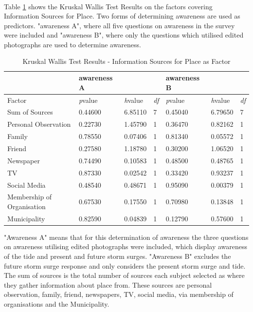 \paragraph{}

Table \ref{kw_test_info_place} shows the Kruskal Wallis Test Results on the factors covering Information Sources for Place. Two forms of determining awareness are used as predictors. "awareness A", where all five questions on awareness in the survey were included and "awareness B", where only the questions which utilised edited photographs are used to determine awareness.

\begin{table}[H]
    \centering
    \begin{tabular}{|l|l|l|l|l|l|l|}
    \hline
       & \textbf{awareness A} & ~ & ~ & \textbf{awareness B} & ~ & ~ \\ \hline
       Factor &\textit{p}value &\textit{h}value & \textit{df} &\textit{p}value &\textit{h}value & \textit{df} \\ \hline
        Sum of Sources  & 0.44600 & 6.85110 & 7 & 0.45040 & 6.79650 & 7 \\ \hline
        Personal Observation & 0.22730 & 1.45790 & 1 & 0.36470 & 0.82162 & 1 \\ \hline
        Family & 0.78550 & 0.07406 & 1 & 0.81340 & 0.05572 & 1 \\ \hline
        Friend & 0.27580 & 1.18780 & 1 & 0.30200 & 1.06520 & 1 \\ \hline
        Newspaper & 0.74490 & 0.10583 & 1 & 0.48500 & 0.48765 & 1 \\ \hline
        TV & 0.87330 & 0.02542 & 1 & 0.33420 & 0.93237 & 1 \\ \hline
        Social Media & 0.48540 & 0.48671 & 1 & 0.95090 & 0.00379 & 1 \\ \hline
        Membership of Organisation  & 0.67530 & 0.17550 & 1 & 0.70980 & 0.13848 & 1 \\ \hline
        Municipality & 0.82590 & 0.04839 & 1 & 0.12790 & 0.57600 & 1 \\ \hline
        \hline
    \end{tabular}
    \caption{Kruskal Wallis Test Results - Information Sources for Place as Factor}{  "Awareness A" means that for this determination of awareness the three questions on awareness utilising edited photographs were included, which display awareness of the tide and present and future storm surges.  "Awareness B" excludes the future storm surge response and only considers the present storm surge and tide.  The sum of sources is the total number of sources each subject selected as where they gather information about place from. These sources are personal observation, family, friend, newspapers, TV, social media, via membership of organisations and the Municipality. }
    \label{kw_test_info_place}
\end{table}

